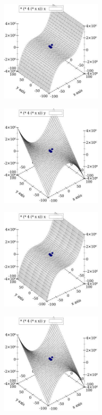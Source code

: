 \documentclass[10pt,a4paper]{article}
\begin{document}
\begin{center}
\includegraphics[width=5cm, height=5cm]{f1-5}
\end{center}
\begin{center}
\includegraphics[width=5cm, height=5cm]{f1-6}
\end{center}
\begin{center}
\includegraphics[width=5cm, height=5cm]{f1-7}
\end{center}
\begin{center}
\includegraphics[width=5cm, height=5cm]{f1-8}
\end{center}
\end{document}
